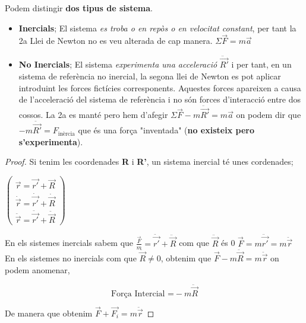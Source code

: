 \documentclass[12pt]{article}
\begin{document}
Podem distingir \textbf{dos tipus de sistema}.

\begin{itemize}
    \item \textbf{Inercials}; El sistema \textit{es troba o en repòs o en velocitat constant}, per tant la 2a Llei de Newton no es veu alterada de cap manera. $\Sigma \vec{F} = m\vec{a}$
    \item \textbf{No Inercials}; El sistema \textit{experimenta una acceleració} $\ddot{\vec{R'}}$ i per tant, en un sistema de referència no inercial, la segona llei de Newton es pot aplicar introduint les forces fictícies corresponents. Aquestes forces apareixen a causa de l’acceleració del sistema de referència i no són forces d’interacció entre dos cossos. La 2a es manté pero hem d'afegir $\Sigma \vec{F} - m\ddot{\vec{R'}} = m\vec{a}$ on podem dir que $-m\ddot{\vec{R'}} = F_{\text{inèrcia}}$ que és una força "inventada" (\textbf{no existeix pero s'experimenta}).
\end{itemize}

\begin{center}
\end{center}

\begin{proof}
    Si tenim les coordenades \textbf{R} i \textbf{R'}, un sistema inercial té unes cordenades;

    $ \begin{pmatrix}
\vec{r} = \vec{r'} + \vec{R} \\
\dot{\vec{r}} = \dot{\vec{r'}} + \dot{\vec{R}} \\
\ddot{\vec{r}} =\ddot{\vec{r'}} + \ddot{\vec{R}} 
\end{pmatrix}  $

En els sistemes inercials sabem que $\frac{\vec{F}}{m} = \ddot{\vec{r'}} + \ddot{\vec{R}}$ com que $\ddot{\vec{R}}$ és 0 $\vec{F} = m\ddot{\vec{r'}}= m \ddot{\vec{r}}$
En els sistemes no inercials com que $\ddot{\vec{R}} \neq 0$, obtenim que $\vec{F} -m\ddot{\vec{R}} = m \ddot{\vec{r}}$ on podem anomenar,

\[\text{Força Intercial =} -m \ddot{\vec{R}}\]

De manera que obtenim $\vec{F} + \vec{F_i} = m \ddot{\vec{r}}$
\end{proof}
\end{document}

